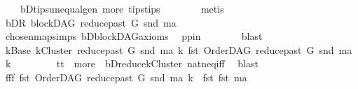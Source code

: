 \begin{isabellebody}
\ \ \ \ bD{\isachardot}{\kern0pt}tips{\isacharunderscore}{\kern0pt}unequal{\isacharunderscore}{\kern0pt}gen\ more\ tips{\isacharunderscore}{\kern0pt}tips\isanewline
\ \ \ \ \ \ \isamarkupfalse%
\ {\isacharparenleft}{\kern0pt}metis{\isacharparenright}{\kern0pt}\ \isanewline
\ \ \ \ \isamarkupfalse%
\ \isamarkupfalse%
\ bDR{\isacharcolon}{\kern0pt}\ {\isachardoublequoteopen}blockDAG\ {\isacharparenleft}{\kern0pt}reduce{\isacharunderscore}{\kern0pt}past\ G\ {\isacharparenleft}{\kern0pt}snd\ ma{\isacharparenright}{\kern0pt}{\isacharparenright}{\kern0pt}{\isachardoublequoteclose}\ \isanewline
\ \ \ \ \ \ \isamarkupfalse%
\ chosen{\isacharunderscore}{\kern0pt}map{\isacharunderscore}{\kern0pt}simps{\isacharparenleft}{\kern0pt}{}{\isacharparenright}{\kern0pt}\ bD{\isachardot}{\kern0pt}blockDAG{\isacharunderscore}{\kern0pt}axioms\ \isamarkupfalse%
\ pp{\isacharunderscore}{\kern0pt}in\isanewline
\ \ \ \ \ \ \isamarkupfalse%
\ blast\ \isanewline
\ \ \ \ \isamarkupfalse%
\ \isamarkupfalse%
\ kBase{\isacharcolon}{\kern0pt}\ {\isachardoublequoteopen}kCluster\ {\isacharparenleft}{\kern0pt}reduce{\isacharunderscore}{\kern0pt}past\ G\ {\isacharparenleft}{\kern0pt}snd\ ma{\isacharparenright}{\kern0pt}{\isacharparenright}{\kern0pt}\ k\ {\isacharparenleft}{\kern0pt}fst\ {\isacharparenleft}{\kern0pt}OrderDAG\ {\isacharparenleft}{\kern0pt}reduce{\isacharunderscore}{\kern0pt}past\ G\ {\isacharparenleft}{\kern0pt}snd\ ma{\isacharparenright}{\kern0pt}{\isacharparenright}{\kern0pt}\ k{\isacharparenright}{\kern0pt}{\isacharparenright}{\kern0pt}{\isachardoublequoteclose}\ \isanewline
\ \ \ \ \ \ \isamarkupfalse%
\ tt\ {}\ more\ \ bD{\isachardot}{\kern0pt}reduce{\isacharunderscore}{\kern0pt}kCluster\ nat{\isacharunderscore}{\kern0pt}neq{\isacharunderscore}{\kern0pt}iff\ \isamarkupfalse%
\ blast\ \isanewline
\ \ \ \ \isamarkupfalse%
\ fff{\isacharcolon}{\kern0pt}\ {\isachardoublequoteopen}{\isacharparenleft}{\kern0pt}fst\ {\isacharparenleft}{\kern0pt}OrderDAG\ {\isacharparenleft}{\kern0pt}reduce{\isacharunderscore}{\kern0pt}past\ G\ {\isacharparenleft}{\kern0pt}snd\ ma{\isacharparenright}{\kern0pt}{\isacharparenright}{\kern0pt}\ k{\isacharparenright}{\kern0pt}{\isacharparenright}{\kern0pt}\ {\isacharequal}{\kern0pt}\ {\isacharparenleft}{\kern0pt}fst\ {\isacharparenleft}{\kern0pt}fst\ ma{\isacharparenright}{\kern0pt}{\isacharparenright}{\kern0pt}{\isachardoublequoteclose}\isanewline

\end{isabellebody}
